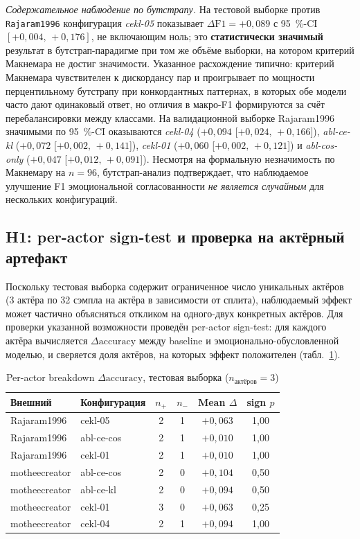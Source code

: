 \documentclass[a4paper, 12pt, oneside, openany]{article}
\begin{document}
\textit{Содержательное наблюдение по бутстрапу.} На тестовой выборке против \texttt{Rajaram1996} конфигурация \textit{cekl-05} показывает $\Delta\mathrm{F1}=+0{,}089$ с 95~\%-CI $[+0{,}004,\,+0{,}176]$, не включающим ноль; это \textbf{статистически значимый} результат в бутстрап-парадигме при том же объёме выборки, на котором критерий Макнемара не достиг значимости. Указанное расхождение типично: критерий Макнемара чувствителен к дискордансу пар и проигрывает по мощности перцентильному бутстрапу при конкордантных паттернах, в которых обе модели часто дают одинаковый ответ, но отличия в макро-F1 формируются за счёт перебалансировки между классами. На валидационной выборке Rajaram1996 значимыми по 95~\%-CI оказываются \textit{cekl-04} ($+0{,}094$ [$+0{,}024,\,+0{,}166$]), \textit{abl-ce-kl} ($+0{,}072$ [$+0{,}002,\,+0{,}141$]), \textit{cekl-01} ($+0{,}060$ [$+0{,}002,\,+0{,}121$]) и \textit{abl-cos-only} ($+0{,}047$ [$+0{,}012,\,+0{,}091$]). Несмотря на формальную незначимость по Макнемару на $n=96$, бутстрап-анализ подтверждает, что наблюдаемое улучшение F1 эмоциональной согласованности \textit{не является случайным} для нескольких конфигураций.

\subsection{H1: per-actor sign-test и проверка на актёрный артефакт}

Поскольку тестовая выборка содержит ограниченное число уникальных актёров (3 актёра по 32 сэмпла на актёра в зависимости от сплита), наблюдаемый эффект может частично объясняться откликом на одного-двух конкретных актёров. Для проверки указанной возможности проведён per-actor sign-test: для каждого актёра вычисляется $\Delta\mathrm{accuracy}$ между baseline и эмоционально-обусловленной моделью, и сверяется доля актёров, на которых эффект положителен (табл.~\ref{tab:per_actor}).

\begin{table}[H]
\caption{Per-actor breakdown $\Delta\mathrm{accuracy}$, тестовая выборка ($n_{\text{актёров}}=3$)}
\label{tab:per_actor}
\centering
\small
\begin{tabular}{|p{2.6cm}|p{2.7cm}|c|c|c|c|}
\hline
\textbf{Внешний} & \textbf{Конфигурация} & $n_+$ & $n_-$ & \textbf{Mean $\Delta$} & \textbf{sign $p$} \\
\hline
Rajaram1996 & cekl-05 & 2 & 1 & $+0{,}063$ & 1{,}00 \\
\hline
Rajaram1996 & abl-ce-cos & 2 & 1 & $+0{,}010$ & 1{,}00 \\
\hline
Rajaram1996 & cekl-01 & 2 & 1 & $+0{,}010$ & 1{,}00 \\
\hline
motheecreator & abl-ce-cos & 2 & 0 & $+0{,}104$ & 0{,}50 \\
\hline
motheecreator & abl-ce-kl & 2 & 0 & $+0{,}094$ & 0{,}50 \\
\hline
motheecreator & cekl-01 & 3 & 0 & $+0{,}063$ & 0{,}25 \\
\hline
motheecreator & cekl-04 & 2 & 1 & $+0{,}094$ & 1{,}00 \\
\hline
\end{tabular}
\end{table}
\end{document}

